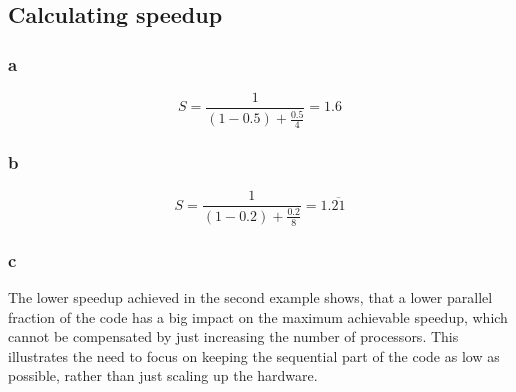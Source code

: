 \subsection{Calculating speedup}
\subsubsection{a}
\[S=\frac{1}{(1-0.5)+\frac{0.5}{4}}=1.6\]
\subsubsection{b}
\[S=\frac{1}{(1-0.2)+\frac{0.2}{8}}=1.\overline{21}\]
\subsubsection{c}
The lower speedup achieved in the second example shows, that a lower parallel fraction of the code has a big impact on the maximum achievable speedup, which cannot be compensated by just increasing the number of processors. This illustrates the need to focus on keeping the sequential part of the code as low as possible, rather than just scaling up the hardware.